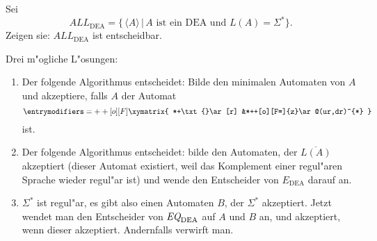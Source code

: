 Sei
\[
{ALL}_{\text{DEA}}=\{\, \langle A\rangle\, |\, \text{$A$ ist ein DEA und $L(A)=\Sigma^*$}\}.
\]
Zeigen sie:
$ALL_{\text{DEA}}$ ist entscheidbar.

\begin{loesung}
Drei m"ogliche L"osungen:
\begin{enumerate}
\item
Der folgende Algorithmus entscheidet: Bilde den minimalen Automaten von
$A$ und akzeptiere, falls $A$ der Automat
\[
\entrymodifiers={++[o][F]}
\xymatrix{
*+\txt{}\ar[r]
        &*++[o][F=]{z}\ar@(ur,dr)^{*}
}
\]
ist.
\item
Der folgende Algorithmus entscheidet: bilde den Automaten, der
$\overline{L(A)}$ akzeptiert (dieser Automat existiert, weil
das Komplement einer regul"aren Sprache wieder regul"ar ist)
und wende den Entscheider von $E_\text{DEA}$ darauf an.
\item
$\Sigma^*$ ist regul"ar, es gibt also einen Automaten $B$, der
$\Sigma^*$ akzeptiert. Jetzt wendet man den Entscheider von
$\text{\it EQ}_{\text{DEA}}$ auf $A$ und $B$ an, und akzeptiert,
wenn dieser akzeptiert. Andernfalls verwirft man.
\end{enumerate}
\end{loesung}
